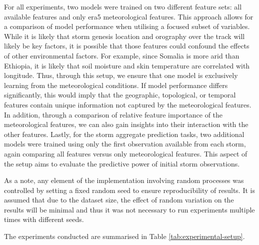 For all experiments, two models were trained on two different feature sets: all available features and only \acrshort{era5} meteorological features. This approach allows for a comparison of model performance when utilising a focused subset of variables. While it is likely that storm genesis location and orography over the track will likely be key factors, it is possible that those features could confound the effects of other environmental factors. For example, since Somalia is more arid than Ethiopia, it is likely that soil moisture and skin temperature are correlated with longitude. Thus, through this setup, we ensure that one model is exclusively learning from the meteorological conditions. If model performance differs significantly, this would imply that the geographic, topological, or temporal features contain unique information not captured by the meteorological features. In addition, through a comparison of relative feature importance of the meteorological features, we can also gain insights into their interaction with the other features. Lastly, for the storm aggregate prediction tasks, two additional models were trained using only the first observation available from each storm, again comparing all features versus only meteorological features. This aspect of the setup aims to evaluate the predictive power of initial storm observations.

As a note, any element of the implementation involving random processes was controlled by setting a fixed random seed to ensure reproducibility of results. It is assumed that due to the dataset size, the effect of random variation on the results will be minimal and thus it was not necessary to run experiments multiple times with different seeds.

The experiments conducted are summarised in Table \ref{tab:experimental-setup}.

